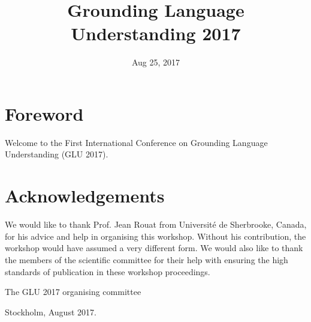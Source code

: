 \documentclass{confproc}
\title{Grounding Language Understanding 2017}
\date{Aug 25, 2017}
\begin{document}
\maketitle
\newpage
\section*{Foreword}
Welcome to the First International Conference on Grounding Language Understanding (GLU 2017).

\section*{Acknowledgements}
We would like to thank Prof. Jean Rouat from Université de Sherbrooke, Canada, for his advice and help in organising this workshop. Without his contribution, the workshop would have assumed a very different form. We would also like to thank the members of the scientific committee for their help with ensuring the high standards of publication in these workshop proceedings.

\vspace{1cm}
\noindent The GLU 2017 organising committee

\noindent Stockholm, August 2017.

\newpage
\end{document}
